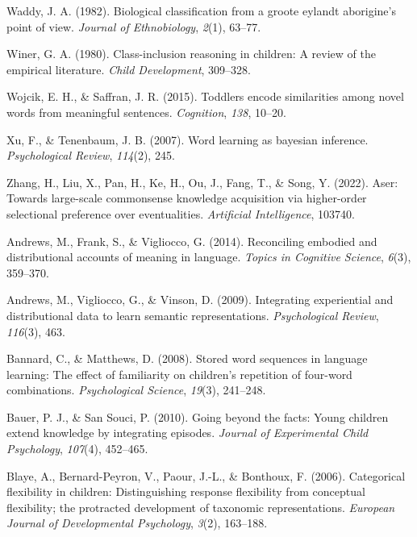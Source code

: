 \documentclass[english,,man]{apa6}
\begin{document}
\leavevmode\hypertarget{ref-waddy1982}{}%
Waddy, J. A. (1982). Biological classification from a groote eylandt aborigine's point of view. \emph{Journal of Ethnobiology}, \emph{2}(1), 63--77.

\leavevmode\hypertarget{ref-winer1980class}{}%
Winer, G. A. (1980). Class-inclusion reasoning in children: A review of the empirical literature. \emph{Child Development}, 309--328.

\leavevmode\hypertarget{ref-wojcik2015}{}%
Wojcik, E. H., \& Saffran, J. R. (2015). Toddlers encode similarities among novel words from meaningful sentences. \emph{Cognition}, \emph{138}, 10--20.

\leavevmode\hypertarget{ref-xu2007word}{}%
Xu, F., \& Tenenbaum, J. B. (2007). Word learning as bayesian inference. \emph{Psychological Review}, \emph{114}(2), 245.

\leavevmode\hypertarget{ref-zhang2022aser}{}%
Zhang, H., Liu, X., Pan, H., Ke, H., Ou, J., Fang, T., \& Song, Y. (2022). Aser: Towards large-scale commonsense knowledge acquisition via higher-order selectional preference over eventualities. \emph{Artificial Intelligence}, 103740.

\leavevmode\hypertarget{ref-andrews2014}{}%
Andrews, M., Frank, S., \& Vigliocco, G. (2014). Reconciling embodied and distributional accounts of meaning in language. \emph{Topics in Cognitive Science}, \emph{6}(3), 359--370.

\leavevmode\hypertarget{ref-andrews2009integrating}{}%
Andrews, M., Vigliocco, G., \& Vinson, D. (2009). Integrating experiential and distributional data to learn semantic representations. \emph{Psychological Review}, \emph{116}(3), 463.

\leavevmode\hypertarget{ref-bannard2008}{}%
Bannard, C., \& Matthews, D. (2008). Stored word sequences in language learning: The effect of familiarity on children's repetition of four-word combinations. \emph{Psychological Science}, \emph{19}(3), 241--248.

\leavevmode\hypertarget{ref-bauer2010going}{}%
Bauer, P. J., \& San Souci, P. (2010). Going beyond the facts: Young children extend knowledge by integrating episodes. \emph{Journal of Experimental Child Psychology}, \emph{107}(4), 452--465.

\leavevmode\hypertarget{ref-blaye2006categorical}{}%
Blaye, A., Bernard-Peyron, V., Paour, J.-L., \& Bonthoux, F. (2006). Categorical flexibility in children: Distinguishing response flexibility from conceptual flexibility; the protracted development of taxonomic representations. \emph{European Journal of Developmental Psychology}, \emph{3}(2), 163--188.
\end{document}
